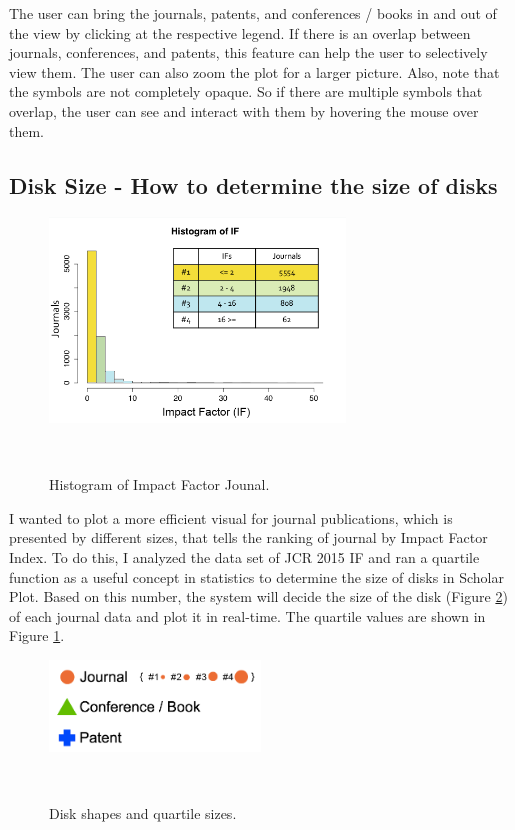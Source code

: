 The user can bring the journals, patents, and conferences / books in and out of the view by clicking at the respective legend. If there is an overlap between journals, conferences, and patents, this feature can help the user to selectively view them. The user can also zoom the plot for a larger picture. Also, note that the symbols are not completely opaque. So if there are multiple symbols that overlap, the user can see and interact with them by hovering the mouse over them.


\subsection*{Disk Size - How to determine the size of disks}

\begin{figure}
  \centering
  \includegraphics[width=0.7\textwidth]{figures/fig-Histogram-IF}
  \caption{Histogram of Impact Factor Jounal.}~\label{fig:Histogram-IF}
\end{figure}

I wanted to plot a more efficient visual for journal publications, which is presented by different sizes, that tells the ranking of journal by Impact Factor Index. To do this, I analyzed the data set of JCR 2015 IF and ran a quartile function as a useful concept in statistics to determine the size of disks in Scholar Plot. Based on this number, the system will decide the size of the disk (Figure \ref{fig-disksize}) of each journal data and plot it in real-time. The quartile values are shown in Figure \ref{fig:Histogram-IF}. %

\begin{figure}
  \centering
  \includegraphics[width=0.5\textwidth]{figures/fig-disksize}
  \caption{Disk shapes and quartile sizes.}~\label{fig-disksize}
\end{figure}





